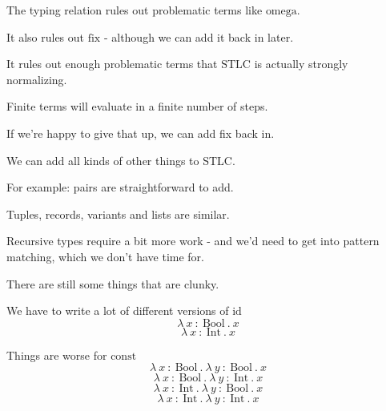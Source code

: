 \begin{frame}
  The typing relation rules out problematic terms like $\text{omega}$.
\end{frame}

\begin{frame}
  It also rules out $\text{fix}$ - although we can add it back in later.
\end{frame}

\begin{frame}
  It rules out enough problematic terms that $\text{STLC}$ is actually strongly normalizing.
\end{frame}

\begin{frame}
  Finite terms will evaluate in a finite number of steps.
\end{frame}

\begin{frame}
  If we're happy to give that up, we can add fix back in.
\end{frame}



\begin{frame}
 We can add all kinds of other things to STLC. 
\end{frame}

\begin{frame}
For example: pairs are straightforward to add.
\end{frame}



\begin{frame}
  Tuples, records, variants and lists are similar.
\end{frame}

\begin{frame}
  Recursive types require a bit more work - and we'd need to get into pattern
  matching, which we don't have time for.
\end{frame}

\begin{frame}
  There are still some things that are clunky.
\end{frame}

\begin{frame}
  We have to write a lot of different versions of $\text{id}$
  \[ \lambda~x~{:}~\text{Bool}~.~x \]
  \[ \lambda~x~{:}~\text{Int}~.~x \]
\end{frame}

\begin{frame}
  Things are worse for $\text{const}$
  \[ \lambda~x~{:}~\text{Bool}~.~\lambda~y~{:}~\text{Bool}~.~x \]
  \[ \lambda~x~{:}~\text{Bool}~.~\lambda~y~{:}~\text{Int}~.~x \]
  \[ \lambda~x~{:}~\text{Int}~.~\lambda~y~{:}~\text{Bool}~.~x \]
  \[ \lambda~x~{:}~\text{Int}~.~\lambda~y~{:}~\text{Int}~.~x \]
\end{frame}

